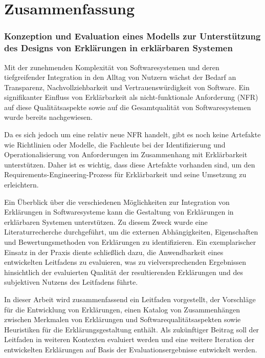 \chapter*{Zusammenfassung}

\subsection*{Konzeption und Evaluation eines Modells zur Unterstützung des Designs von Erklärungen in erklärbaren Systemen}

Mit der zunehmenden Komplexität von Softwaresystemen und deren tiefgreifender Integration in den Alltag von Nutzern wächst der Bedarf an Transparenz, Nachvollziehbarkeit und Vertrauenswürdigkeit von Software. Ein signifikanter Einfluss von Erklärbarkeit als nicht-funktionale Anforderung (NFR) auf diese Qualitätsaspekte sowie auf die Gesamtqualität von Softwaresystemen wurde bereits nachgewiesen.

Da es sich jedoch um eine relativ neue NFR handelt, gibt es noch keine Artefakte wie Richtlinien oder Modelle, die Fachleute bei der Identifizierung und Operationalisierung von Anforderungen im Zusammenhang mit Erklärbarkeit unterstützen. Daher ist es wichtig, dass diese Artefakte vorhanden sind, um den Requirements-Engineering-Prozess für Erklärbarkeit und seine Umsetzung zu erleichtern.

Ein Überblick über die verschiedenen Möglichkeiten zur Integration von Erklärungen in Softwaresysteme kann die Gestaltung von Erklärungen in erklärbaren Systemen unterstützen. Zu diesem Zweck wurde eine Literaturrecherche durchgeführt, um die externen Abhängigkeiten, Eigenschaften und Bewertungsmethoden von Erklärungen zu identifizieren. Ein exemplarischer Einsatz in der Praxis diente schließlich dazu, die Anwendbarkeit eines entwickelten Leitfadens zu evaluieren, was zu vielversprechenden Ergebnissen hinsichtlich der evaluierten Qualität der resultierenden Erklärungen und des subjektiven Nutzens des Leitfadens führte. 

In dieser Arbeit wird zusammenfassend ein Leitfaden vorgestellt, der Vorschläge für die Entwicklung von Erklärungen, einen Katalog von Zusammenhängen zwischen Merkmalen von Erklärungen und Softwarequalitätsaspekten sowie Heuristiken für die Erklärungsgestaltung enthält. Als zukünftiger Beitrag soll der Leitfaden in weiteren Kontexten evaluiert werden und eine weitere Iteration der entwickelten Erklärungen auf Basis der Evaluationsergebnisse entwickelt werden.

